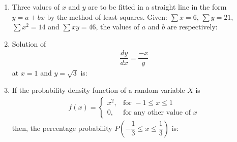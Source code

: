 \documentclass[journal]{IEEEtran}
\begin{document}
\begin{enumerate}
\item Three values of $x$ and $y$ are to be fitted in a straight line in the form $y = a + bx$ by the method of least squares. Given: $\sum x = 6$, $\sum y = 21$, $\sum x^2 = 14$ and $\sum xy = 46$, the values of $a$ and $b$ are respectively: \hfill {}
\begin{enumerate}
\end{enumerate}

\item Solution of \begin{align} \dfrac{dy}{dx} = \dfrac{-x}{y} \end{align}at $x = 1$ and $y = \sqrt{3}$ is: \hfill {}
\begin{enumerate}
\end{enumerate}

\item If the probability density function of a random variable $X$ is  
\begin{align}
f(x) = 
\begin{cases}
x^2, & \text{for } -1 \leq x \leq 1 \\
0, & \text{for any other value of } x
\end{cases}
\end{align}
then, the percentage probability $P\left( -\dfrac{1}{3} \leq x \leq \dfrac{1}{3} \right)$ is: \hfill {}
\begin{enumerate}
\end{enumerate}


\end{enumerate}
\end{document}
